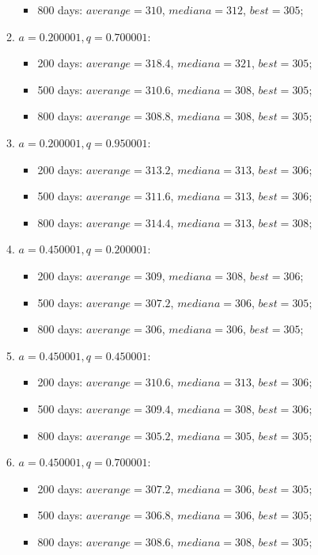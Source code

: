 \begin{enumerate}
\begin{enumerate}
\begin{itemize}
			\item 800 days: $averange = 310$, $mediana = 312$, $best = 305$;
		\end{itemize}
		\item $a= 0.200001, q= 0.700001$:
		\begin{itemize}
			\item 200 days: $averange = 318.4$, $mediana = 321$, $best = 305$;
			\item 500 days: $averange = 310.6$, $mediana = 308$, $best = 305$;
			\item 800 days: $averange = 308.8$, $mediana = 308$, $best = 305$;
		\end{itemize}
		\item $a= 0.200001, q= 0.950001$:
		\begin{itemize}
			\item 200 days: $averange = 313.2$, $mediana = 313$, $best = 306$;
			\item 500 days: $averange = 311.6$, $mediana = 313$, $best = 306$;
			\item 800 days: $averange = 314.4$, $mediana = 313$, $best = 308$;
		\end{itemize}
		\item $a= 0.450001, q= 0.200001$:
		\begin{itemize}
			\item 200 days: $averange = 309$, $mediana = 308$, $best = 306$;
			\item 500 days: $averange = 307.2$, $mediana = 306$, $best = 305$;
			\item 800 days: $averange = 306$, $mediana = 306$, $best = 305$;
		\end{itemize}
		\item $a= 0.450001, q= 0.450001$:
		\begin{itemize}
			\item 200 days: $averange = 310.6$, $mediana = 313$, $best = 306$;
			\item 500 days: $averange = 309.4$, $mediana = 308$, $best = 306$;
			\item 800 days: $averange = 305.2$, $mediana = 305$, $best = 305$;
		\end{itemize}
		\item $a= 0.450001, q= 0.700001$:
		\begin{itemize}
			\item 200 days: $averange = 307.2$, $mediana = 306$, $best = 305$;
			\item 500 days: $averange = 306.8$, $mediana = 306$, $best = 305$;
			\item 800 days: $averange = 308.6$, $mediana = 308$, $best = 305$;

\end{itemize}
\end{enumerate}
\end{enumerate}
